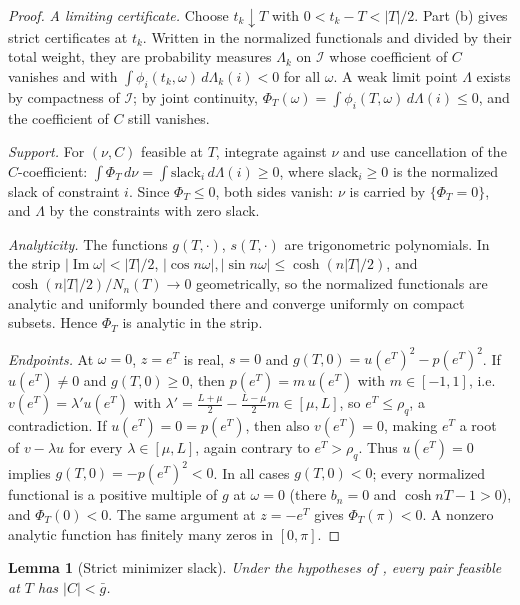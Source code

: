 \documentclass[11pt]{article}
\newtheorem{lemma}[theorem]{Lemma}
\theoremstyle{definition}
\theoremstyle{remark}
\newcommand{\ch}{\cosh}
\newcommand{\Ima}{\operatorname{Im}}
\begin{document}
\begin{proof}
\emph{A limiting certificate.}  Choose \(t_k\downarrow T\) with
\(0<t_k-T<|T|/2\).  Part (b) gives strict certificates
at \(t_k\).  Written in the normalized functionals and divided by their total
weight, they are probability measures \(\Lambda_k\) on \(\mathcal I\) whose coefficient of
\(C\) vanishes and with \(\int\phi_i(t_k,\omega)\,d\Lambda_k(i)<0\) for all \(\omega\).  A weak limit point
\(\Lambda\) exists by compactness of \(\mathcal I\); by joint continuity,
\(\Phi_T(\omega)=\int\phi_i(T,\omega)\,d\Lambda(i)\le0\), and the coefficient of \(C\) still vanishes.

\emph{Support.}  For \((\nu,C)\) feasible at \(T\), integrate against \(\nu\)
and use cancellation of the \(C\)-coefficient:
\(\int\Phi_T\,d\nu=\int\mathrm{slack}_i\,d\Lambda(i)\ge0\), where \(\mathrm{slack}_i\ge0\) is the
normalized slack of constraint \(i\).  Since \(\Phi_T\le0\), both sides vanish: \(\nu\) is
carried by \(\{\Phi_T=0\}\), and \(\Lambda\) by the constraints with zero slack.

\emph{Analyticity.}  The functions \(g(T,\cdot)\), \(s(T,\cdot)\) are trigonometric
polynomials.  In the strip \(|\Ima\omega|<|T|/2\), \(|\cos n\omega|,|\sin n\omega|\le\ch(n|T|/2)\), and
\(\ch(n|T|/2)/N_n(T)\to0\) geometrically, so the normalized functionals are analytic
and uniformly bounded there and converge uniformly on compact subsets.
Hence \(\Phi_T\) is analytic in the strip.

\emph{Endpoints.}  At \(\omega=0\), \(z=e^T\) is real, \(s=0\) and \(g(T,0)=u(e^T)^2-p(e^T)^2\).  If
\(u(e^T)\ne0\) and \(g(T,0)\ge0\), then \(p(e^T)=m\,u(e^T)\) with \(m\in[-1,1]\), i.e.\
\(v(e^T)=\lambda'u(e^T)\) with \(\lambda'=\frac{L+\mu}2-\frac{L-\mu}2m\in[\mu,L]\), so \(e^T\le\rho_q\), a
contradiction.  If \(u(e^T)=0=p(e^T)\), then also \(v(e^T)=0\), making \(e^T\) a root of
\(v-\lambda u\) for every \(\lambda\in[\mu,L]\), again contrary to \(e^T>\rho_q\).  Thus
\(u(e^T)=0\) implies \(g(T,0)=-p(e^T)^2<0\).  In all cases \(g(T,0)<0\); every normalized functional is a positive multiple of \(g\) at \(\omega=0\)
(there \(b_n=0\) and \(\ch nT-1>0\)), and \(\Phi_T(0)<0\).  The same argument at
\(z=-e^T\) gives \(\Phi_T(\pi)<0\).  A nonzero analytic function has finitely many
zeros in \([0,\pi]\).
\end{proof}

\begin{lemma}[Strict minimizer slack]\label{lem:strict}
Under the hypotheses of , every pair feasible at \(T\) has
\(|C|<\bar g\).
\end{lemma}
\end{document}
